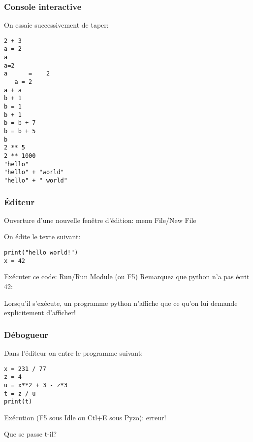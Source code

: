 \subsubsection{Console interactive}

On essaie successivement de taper:
\begin{multicols}{2}
\begin{lstlisting}
2 + 3
a = 2
a
a=2
a      =    2
   a = 2
a + a
b + 1
b = 1
b + 1
b = b + 7
b = b + 5
b
2 ** 5
2 ** 1000
"hello"
"hello" + "world"
"hello" + " world"
\end{lstlisting}
\end{multicols}
%
\subsubsection{Éditeur}

Ouverture d'une nouvelle fenêtre d'édition: menu File/New File

On édite le texte suivant:
\begin{lstlisting}
print("hello world!")
x = 42
\end{lstlisting}

Exécuter ce code: Run/Run Module (ou F5)
Remarquez que python n'a pas écrit 42:

Lorsqu'il s'exécute, un programme python n'affiche que ce qu'on lui
demande explicitement d'afficher!

\subsubsection{Débogueur}

Dans l'éditeur on entre le programme suivant:
\begin{lstlisting}
x = 231 / 77
z = 4
u = x**2 + 3 - z*3
t = z / u
print(t)
\end{lstlisting}
Exécution (F5 sous Idle ou Ctl+E sous Pyzo): erreur!

Que se passe t-il?

